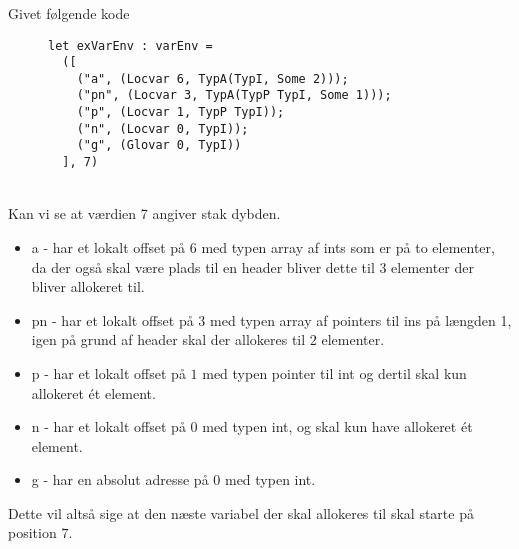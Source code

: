 \subsubsection{}
Givet følgende kode
\begin{figure}[!ht]\label{fig:exVarEnv}
\begin{verbatim}
let exVarEnv : varEnv = 
  ([
    ("a", (Locvar 6, TypA(TypI, Some 2)));
    ("pn", (Locvar 3, TypA(TypP TypI, Some 1)));
    ("p", (Locvar 1, TypP TypI));
    ("n", (Locvar 0, TypI));
    ("g", (Glovar 0, TypI))
  ], 7)
\end{verbatim} 
  \caption{}
\end{figure}\\
Kan vi se at værdien 7 angiver stak dybden. 
\begin{itemize}
  \item a - har et lokalt offset på $6$ med typen array af ints som er på to elementer, da der også skal være plads til en header bliver dette til $3$ elementer der bliver allokeret til.
  \item pn - har et lokalt offset på $3$ med typen array af pointers til ins på længden 1, igen på grund af header skal der allokeres til $2$ elementer.
  \item p - har et lokalt offset på $1$ med typen pointer til int og dertil skal kun allokeret ét element.
  \item n - har et lokalt offset på $0$ med typen int, og skal kun have allokeret ét element.
  \item g - har en absolut adresse på $0$ med typen int.
\end{itemize}
Dette vil altså sige at den næste variabel der skal allokeres til skal starte på position $7$.